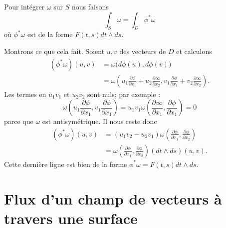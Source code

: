 \begin{definition}
    Pour intégrer \( \omega\) sur \( S\) nous faisons
    \begin{equation}
        \int_S\omega=\int_D\phi^*\omega
    \end{equation}
    où \( \phi^*\omega\) est de la forme \( F(t,s)dt\wedge ds\).
\end{definition}
Montrons ce que cela fait. Soient \( u,v\) des vecteurs de \( D\) et calculons
\begin{subequations}
    \begin{align}
        (\phi^*\omega)(u,v)&=\omega\big( d\phi(u),d\phi(v) \big)\\
        &=\omega\left(    u_1\frac{ \partial \phi }{ \partial x_1 }+u_2\frac{ \partial \infty }{ \partial x_2 },v_1\frac{ \partial \phi }{ \partial x_1 }+v_2\frac{ \partial \infty }{ \partial x_2 }   \right).
    \end{align}
\end{subequations}
Les termes en \( u_1v_1\) et \( u_2v_2\) sont nuls; par exemple :
\begin{equation}
    \omega\left( u_1\frac{ \partial \phi }{ \partial x_1 },v_1\frac{ \partial \phi }{ \partial x_1 } \right)=u_1v_1\omega\left( \frac{ \partial \infty }{ \partial x_1 },\frac{ \partial \phi }{ \partial x_1 } \right)=0
\end{equation}
parce que \( \omega\) est antisymétrique. Il nous reste donc
\begin{subequations}
    \begin{align}
        (\phi^*\omega)(u,v)&=(u_1v_2-u_2v_1)\omega\left( \frac{ \partial \phi }{ \partial x_1 },\frac{ \partial \phi }{ \partial x_2 } \right)\\
        &=\omega\left( \frac{ \partial \phi }{ \partial x_1 },\frac{ \partial \phi }{ \partial x_2 } \right)(dt\wedge ds)(u,v).
    \end{align}
\end{subequations}
Cette dernière ligne est bien de la forme \( \phi^*\omega=F(t,s)dt\wedge ds\).

\section{Flux d'un champ de vecteurs à travers une surface}

